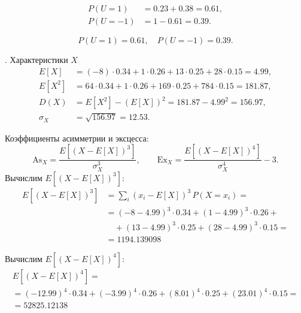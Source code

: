 \documentclass[a4paper,14pt]{extarticle}
\begin{document}
            \[
                \begin{aligned}
                    P(U=1) &= 0.23 + 0.38 = 0.61,\\
                    P(U=-1) &= 1 - 0.61 = 0.39.
                \end{aligned}
            \]
            
            \[
                \boxed{P(U=1)=0.61, \quad P(U=-1)=0.39.}
            \]
            
            
            . Характеристики $X$
            \[
                \begin{aligned}
                    E[X] &= (-8)\cdot0.34 + 1\cdot0.26 + 13\cdot0.25 + 28\cdot0.15 = 4.99, \\
                    E[X^2] &= 64\cdot0.34 + 1\cdot0.26 + 169\cdot0.25 + 784\cdot0.15 = 181.87, \\
                    D(X) &= E[X^2] - (E[X])^2 = 181.87 - 4.99^2 = 156.97, \\
                    \sigma_X &= \sqrt{156.97} = 12.53.
                \end{aligned}
            \]
            
            Коэффициенты асимметрии и эксцесса:
            \[
                \mathrm{As}_X = \frac{E[(X - E[X])^3]}{\sigma_X^3},
                \qquad
                \mathrm{Ex}_X = \frac{E[(X - E[X])^4]}{\sigma_X^4} - 3.
            \]
            Вычислим $E[(X - E[X])^3]$:
            \[
                \begin{aligned}
                    E[(X - E[X])^3] &= \sum_i (x_i - E[X])^3 \, P(X=x_i) = \\
                    &= (-8 - 4.99)^3 \cdot 0.34 + (1 - 4.99)^3 \cdot 0.26 + \\
                    &\quad + (13 - 4.99)^3 \cdot 0.25 + (28 - 4.99)^3 \cdot 0.15 = \\
                    &= 1194.139098
                \end{aligned}
            \]
            
            Вычислим $E[(X - E[X])^4]$:
            \begin{gather*}
                E[(X - E[X])^4] = \\
                = (-12.99)^4 \cdot 0.34 + (-3.99)^4 \cdot 0.26 + (8.01)^4 \cdot 0.25 + (23.01)^4 \cdot 0.15 = \\
                = 52825.12138
            \end{gather*}
            
\end{document}
